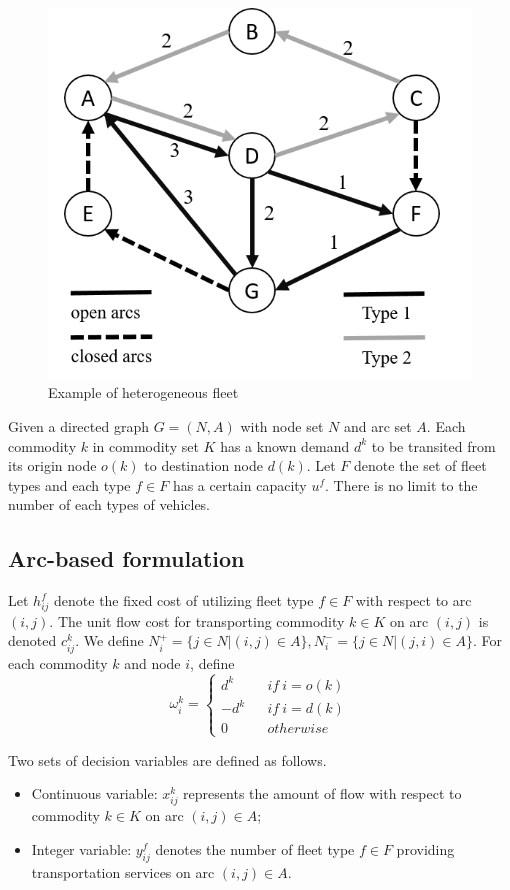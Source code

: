 \documentclass[11pt,nonblindrev,fleqn]{article}
\begin{document}
\begin{figure}[H]
\setlength{\abovecaptionskip}{-5pt}
\setlength{\belowcaptionskip}{-5pt}
\centering
\includegraphics[width=0.4\linewidth]{F1.png}
\caption{Example of heterogeneous fleet}
\label{Fig1}
\end{figure}

Given a directed graph $G=(N,A)$ with node set $N$ and arc set $A$. Each commodity $k$ in commodity set $K$ has a known demand $d^k$ to be transited from its origin node $o(k)$ to destination node $d(k)$. Let $F$ denote the set of fleet types and each type $f\in F$ has a certain capacity $u^f$. There is no limit to the number of each types of vehicles.

\subsection{Arc-based formulation}
Let  $h_{ij}^f$ denote the fixed cost of utilizing fleet type $f\in F$ with respect to arc $(i,j)$. The unit flow cost for transporting commodity $k\in K$ on arc $(i,j)$ is denoted $c_{ij}^k$. We define $N_i^+= \{j\in N|(i,j)\in A\},N_i^-= \{j\in N|(j,i)\in A\}$. For each commodity $k$ and node $i$, define
\begin{equation*}
\omega_i^k= \left\{
\begin{aligned}
d^k&  & if \ i=o(k) \\
-d^k&  & if \ i=d(k) \\
0&  & otherwise
\end{aligned}
\right.
\end{equation*}

Two sets of decision variables are defined as follows.
\begin{itemize}
  \item Continuous variable: $x_{ij}^k$ represents the amount of flow with respect to commodity $k\in K$ on arc $(i,j)\in A$;
  \item Integer variable: $y_{ij}^f$ denotes the number of fleet type $f\in F$ providing transportation services on arc $(i,j)\in A$.
\end{itemize}
\end{document}
